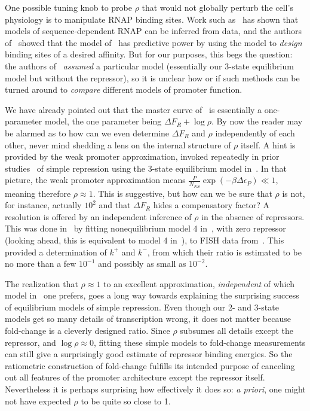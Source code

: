 One possible tuning knob to probe $\rho$ that would not globally perturb the
cell's physiology is to manipulate RNAP binding sites. Work such
as~\cite{Kinney2010} has shown that models of sequence-dependent RNAP can be
inferred from data, and the authors of~\cite{Brewster2012} showed that the model
of~\cite{Kinney2010} has predictive power by using the model to \textit{design}
binding sites of a desired affinity. But for our purposes, this begs the
question: the authors of~\cite{Kinney2010} \textit{assumed} a particular model
(essentially our 3-state equilibrium model but without the repressor), so it is
unclear how or if such methods can be turned around to \textit{compare}
different models of promoter function.

We have already pointed out that the master curve of~
is essentially a one-parameter model, the one parameter being $\Delta F_R +
\log\rho$. By now the reader may be alarmed as to how can we even determine
$\Delta F_R$ and $\rho$ independently of each other, never mind shedding a lens
on the internal structure of $\rho$ itself. A hint is provided by the weak
promoter approximation, invoked repeatedly in prior studies~\cite{Bintu2005c,
Garcia2011a, Razo-Mejia2018} of simple repression using the 3-state equilibrium
model in~. In that picture, the weak promoter
approximation means $\frac{P}{N_{NS}}\exp(-\beta\Delta\epsilon_P) \ll 1$,
meaning therefore $\rho\approx1$. This is suggestive, but how can we be sure
that $\rho$ is not, for instance, actually $10^2$ and that $\Delta F_R$ hides a
compensatory factor? A resolution is offered by an independent inference of
$\rho$ in the absence of repressors. This was done in~\cite{Razo-Mejia2020} by
fitting nonequilibrium model 4  in~, with zero
repressor (looking ahead, this is equivalent to model 4
in~), to FISH data from~\cite{Brewster2014}. This
provided a determination of $k^+$ and $k^-$, from which their ratio is estimated
to be no more than a few $10^{-1}$ and possibly as small as $10^{-2}$.

The realization that $\rho\approx1$ to an excellent approximation,
\textit{independent} of which model in~ one prefers,
goes a long way towards explaining the surprising success of equilibrium models
of simple repression. Even though our 2- and 3-state models get so many details
of transcription wrong, it does not matter because fold-change is a cleverly
designed ratio. Since $\rho$ subsumes all details except the repressor, and
$\log\rho\approx0$, fitting these simple models to fold-change measurements can
still give a surprisingly good estimate of repressor binding energies. So the
ratiometric construction of fold-change fulfills its intended purpose of
canceling out all features of the promoter architecture except the repressor
itself. Nevertheless it is perhaps surprising how effectively it does so:
\textit{a priori}, one might not have expected $\rho$ to be quite so close to 1.

